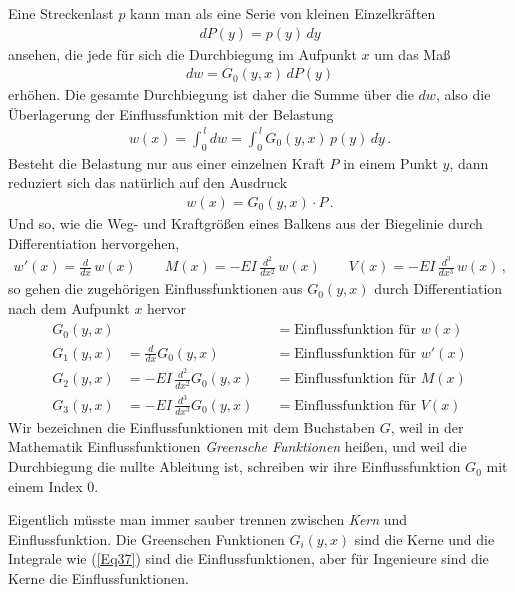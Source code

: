 Eine Streckenlast $p$ kann man als eine Serie von kleinen Einzelkr\"{a}ften
\begin{align}
dP(y) = p(y)\,dy
\end{align}
ansehen, die jede f\"{u}r sich die Durchbiegung im Aufpunkt $x$ um das Ma{\ss}
\begin{align}
dw = G_0(y,x)\,dP(y)
\end{align}
erh\"{o}hen. Die gesamte Durchbiegung ist daher die Summe \"{u}ber die $dw$, also die \"{U}berlagerung der Einflussfunktion mit der Belastung
\begin{align} \label{Eq37}
w(x) = \int_0^{\,l} dw = \int_0^{\,l} G_0(y,x)\,p(y)\,dy\,.
\end{align}
Besteht die Belastung nur aus einer einzelnen Kraft $P$ in einem Punkt $y$, dann reduziert sich das nat\"{u}rlich auf den Ausdruck
\begin{align}
w(x) = G_0(y,x) \cdot P\,.
\end{align}
Und so, wie die Weg- und Kraftgr\"{o}{\ss}en eines Balkens aus der Biegelinie durch Differentiation hervorgehen,
\begin{align}
w'(x) = \frac{d}{dx}\,w(x) \qquad M(x) = - EI\,\frac{d^2}{dx^2}\,w(x) \qquad V(x) = - EI\,\frac{d^3}{dx^3}\,w(x)\,,
\end{align}
so gehen die zugeh\"{o}rigen Einflussfunktionen aus $G_0(y,x)$ durch Differentiation nach dem Aufpunkt $x$ hervor
\begin{subequations}
\begin{alignat}{3}
G_0(y,x) & \phantom{\frac{d}{dx} G_0(y,x)} &&= \text{Einflussfunktion f\"{u}r $w(x)$}\\
G_1(y,x) &= \frac{d}{dx} G_0(y,x) &&= \text{Einflussfunktion f\"{u}r $w'(x)$}\\
G_2(y,x) &= - EI\,\frac{d^2}{dx^2} G_0(y,x) &&= \text{Einflussfunktion f\"{u}r $M(x)$}\\
G_3(y,x) &= - EI\,\frac{d^3}{dx^3} G_0(y,x) &&= \text{Einflussfunktion f\"{u}r $V(x)$}
\end{alignat}
\end{subequations}
Wir bezeichnen die Einflussfunktionen mit dem Buchstaben $G$, weil in der Mathematik Einflussfunktionen {\em Greensche Funktionen\/} hei{\ss}en, und weil die Durchbiegung die nullte Ableitung ist, schreiben wir ihre Einflussfunktion $G_0 $ mit einem Index $0$.

Eigentlich m\"{u}sste man immer sauber trennen zwischen {\em Kern\/} und Einflussfunktion. Die Greenschen Funktionen $G_i(y,x)$ sind die Kerne und die Integrale wie (\ref{Eq37}) sind die Einflussfunktionen, aber f\"{u}r Ingenieure sind die Kerne die Einflussfunktionen.

